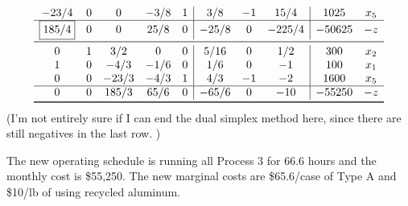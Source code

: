 \documentclass{homework}
\begin{document}
\begin{enumerate}
\begin{align*}
\begin{array}{ccccc|ccc|cc}
					-23/4 & 0 & 0 & -3/8 & 1 & 3/8 & -1 & 15/4 & 1025 & x_5 \\
					\hline
					\boxed{185/4} & 0 & 0 & 25/8 & 0 & -25/8 & 0 & -225/4 & -50625 & -z \\
					\midrule
					0 & 1 & 3/2 & 0 & 0 & 5/16 & 0 & 1/2 & 300 & x_2 \\
					1 & 0 & -4/3 & -1/6 & 0 & 1/6 & 0 & -1 & 100 & x_1 \\
					0 & 0 & -23/3 & -4/3 & 1 & 4/3 & -1 & -2 & 1600 & x_5 \\
					\hline
					0 & 0 & 185/3 & 65/6 & 0 & -65/6 & 0 & -10 & -55250 & -z \\
					\bottomrule
				\end{array}
			\end{align*}
			(I'm not entirely sure if I can end the dual simplex method here, since there are still negatives in the last row. )
			
			The new operating schedule is running all Process 3 for 66.6 hours and the monthly cost is \$55,250. The new marginal costs are \$65.6/case of Type A and \$10/lb of using recycled aluminum. 
			
	\end{enumerate}
\end{document}
